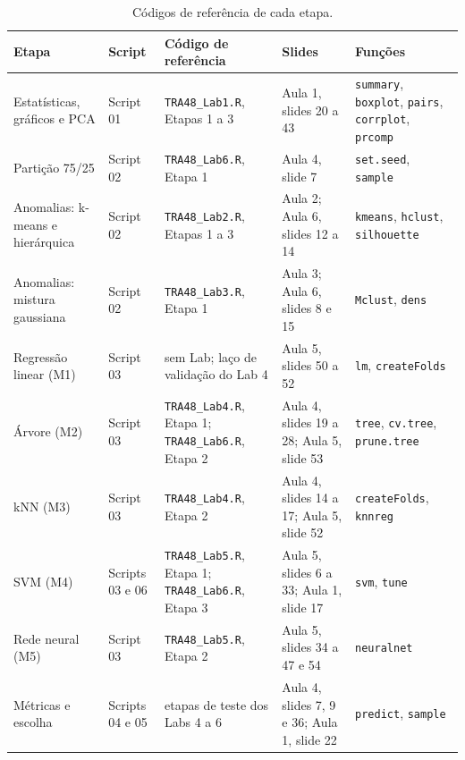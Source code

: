 \documentclass[12pt,a4paper]{article}
\begin{document}
\begin{table}[H]\centering\scriptsize
\caption{Códigos de referência de cada etapa.}\label{tab:labs}
\begin{tabular}{p{2.8cm}p{2.2cm}p{3.3cm}p{2.8cm}p{2.6cm}}
\toprule
Etapa & Script & Código de referência & Slides & Funções\\
\midrule
Estatísticas, gráficos e PCA & Script 01 & \texttt{TRA48\_Lab1.R}, Etapas 1 a 3 & Aula 1, slides 20 a 43 & \texttt{summary}, \texttt{boxplot}, \texttt{pairs}, \texttt{corrplot}, \texttt{prcomp}\\
Partição 75/25 & Script 02 & \texttt{TRA48\_Lab6.R}, Etapa 1 & Aula 4, slide 7 & \texttt{set.seed}, \texttt{sample}\\
Anomalias: k-means e hierárquica & Script 02 & \texttt{TRA48\_Lab2.R}, Etapas 1 a 3 & Aula 2; Aula 6, slides 12 a 14 & \texttt{kmeans}, \texttt{hclust}, \texttt{silhouette}\\
Anomalias: mistura gaussiana & Script 02 & \texttt{TRA48\_Lab3.R}, Etapa 1 & Aula 3; Aula 6, slides 8 e 15 & \texttt{Mclust}, \texttt{dens}\\
Regressão linear (M1) & Script 03 & sem Lab; laço de validação do Lab 4 & Aula 5, slides 50 a 52 & \texttt{lm}, \texttt{createFolds}\\
Árvore (M2) & Script 03 & \texttt{TRA48\_Lab4.R}, Etapa 1; \texttt{TRA48\_Lab6.R}, Etapa 2 & Aula 4, slides 19 a 28; Aula 5, slide 53 & \texttt{tree}, \texttt{cv.tree}, \texttt{prune.tree}\\
kNN (M3) & Script 03 & \texttt{TRA48\_Lab4.R}, Etapa 2 & Aula 4, slides 14 a 17; Aula 5, slide 52 & \texttt{createFolds}, \texttt{knnreg}\\
SVM (M4) & Scripts 03 e 06 & \texttt{TRA48\_Lab5.R}, Etapa 1; \texttt{TRA48\_Lab6.R}, Etapa 3 & Aula 5, slides 6 a 33; Aula 1, slide 17 & \texttt{svm}, \texttt{tune}\\
Rede neural (M5) & Script 03 & \texttt{TRA48\_Lab5.R}, Etapa 2 & Aula 5, slides 34 a 47 e 54 & \texttt{neuralnet}\\
Métricas e escolha & Scripts 04 e 05 & etapas de teste dos Labs 4 a 6 & Aula 4, slides 7, 9 e 36; Aula 1, slide 22 & \texttt{predict}, \texttt{sample}\\
\bottomrule
\end{tabular}
\end{table}
\end{document}
